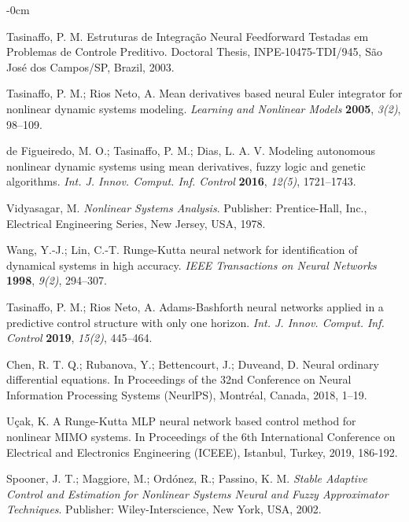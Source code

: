 \documentclass[journal,article,submit,pdftex,moreauthors]{Definitions/mdpi}
\begin{document}
\begin{adjustwidth}{-\extralength}{0cm}
\begin{thebibliography}{999}
Tasinaffo, P. M. Estruturas de Integração Neural Feedforward Testadas em Problemas de Controle Preditivo. Doctoral Thesis, INPE-10475-TDI/945, São José dos Campos/SP, Brazil, 2003.

Tasinaffo, P. M.; Rios Neto, A. Mean derivatives based neural {E}uler integrator for nonlinear dynamic systems modeling. {\em Learning and Nonlinear Models} {\bf 2005}, {\em 3(2)}, 98--109.

de Figueiredo, M. O.; Tasinaffo, P. M.; Dias, L. A. V. Modeling autonomous nonlinear dynamic systems using mean derivatives, fuzzy logic and genetic algorithms. {\em Int. J. Innov. Comput. Inf. Control} {\bf 2016}, {\em 12(5)}, 1721--1743.


Vidyasagar, M. \textit{Nonlinear Systems Analysis}. Publisher: Prentice-Hall, Inc., Electrical Engineering Series, New Jersey, USA, 1978.

Wang, Y.-J.; Lin, C.-T. Runge-{K}utta neural network for identification of dynamical systems in high accuracy. {\em IEEE Transactions on Neural Networks} {\bf 1998}, {\em 9(2)}, 294--307.

Tasinaffo, P. M.; Rios Neto, A. Adams-{B}ashforth neural networks applied in a predictive control structure with only one horizon. {\em Int. J. Innov. Comput. Inf. Control} {\bf 2019}, {\em 15(2)}, 445--464.

Chen, R. T. Q.; Rubanova, Y.; Bettencourt, J.; Duveand, D. Neural ordinary differential equations. In Proceedings of the 32nd Conference on Neural Information Processing Systems (NeurlPS), Montréal, Canada, 2018, 1--19.

Uçak, K. A {R}unge-{K}utta {MLP} neural network based control method for nonlinear {MIMO} systems. In Proceedings of the 6th International Conference on Electrical and Electronics Engineering (ICEEE), Istanbul, Turkey, 2019, 186-192.

Spooner, J. T.; Maggiore, M.; Ordónez, R.; Passino, K. M. \textit{Stable Adaptive Control and Estimation for Nonlinear Systems Neural and Fuzzy Approximator Techniques}. Publisher: Wiley-Interscience, New York, USA, 2002.


\end{thebibliography}
\end{adjustwidth}
\end{document}
